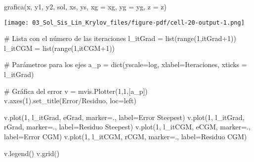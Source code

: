 \documentclass[
  letterpaper,
  DIV=11,
  numbers=noendperiod]{scrreprt}
\newenvironment{Shaded}{\begin{snugshade}}{\end{snugshade}}
\newcommand{\BuiltInTok}[1]{\textcolor[rgb]{0.00,0.23,0.31}{#1}}
\newcommand{\CommentTok}[1]{\textcolor[rgb]{0.37,0.37,0.37}{#1}}
\newcommand{\DecValTok}[1]{\textcolor[rgb]{0.68,0.00,0.00}{#1}}
\newcommand{\NormalTok}[1]{\textcolor[rgb]{0.00,0.23,0.31}{#1}}
\newcommand{\OperatorTok}[1]{\textcolor[rgb]{0.37,0.37,0.37}{#1}}
\newcommand{\StringTok}[1]{\textcolor[rgb]{0.13,0.47,0.30}{#1}}
\begin{document}
\begin{Shaded}
\begin{Highlighting}[]
\NormalTok{grafica(x, y1, y2, sol, xs, ys, xg }\OperatorTok{=}\NormalTok{ xg, yg }\OperatorTok{=}\NormalTok{ yg, z }\OperatorTok{=}\NormalTok{ z)}
\end{Highlighting}
\end{Shaded}

\texttt{[image: 03\_Sol\_Sis\_Lin\_Krylov\_files/figure-pdf/cell-20-output-1.png]}

\begin{Shaded}
\begin{Highlighting}[]
\CommentTok{\# Lista con el número de las iteraciones}
\NormalTok{l\_itGrad }\OperatorTok{=} \BuiltInTok{list}\NormalTok{(}\BuiltInTok{range}\NormalTok{(}\DecValTok{1}\NormalTok{,itGrad}\OperatorTok{+}\DecValTok{1}\NormalTok{)) }
\NormalTok{l\_itCGM }\OperatorTok{=} \BuiltInTok{list}\NormalTok{(}\BuiltInTok{range}\NormalTok{(}\DecValTok{1}\NormalTok{,itCGM}\OperatorTok{+}\DecValTok{1}\NormalTok{))}

\CommentTok{\# Parámetros para los ejes}
\NormalTok{a\_p }\OperatorTok{=} \BuiltInTok{dict}\NormalTok{(yscale}\OperatorTok{=}\StringTok{\textquotesingle{}log\textquotesingle{}}\NormalTok{, xlabel}\OperatorTok{=}\StringTok{\textquotesingle{}Iteraciones\textquotesingle{}}\NormalTok{, xticks }\OperatorTok{=}\NormalTok{ l\_itGrad)}

\CommentTok{\# Gráfica del error}
\NormalTok{v }\OperatorTok{=}\NormalTok{ mvis.Plotter(}\DecValTok{1}\NormalTok{,}\DecValTok{1}\NormalTok{,[a\_p]) }
\NormalTok{v.axes(}\DecValTok{1}\NormalTok{).set\_title(}\StringTok{\textquotesingle{}Error/Residuo\textquotesingle{}}\NormalTok{, loc}\OperatorTok{=}\StringTok{\textquotesingle{}left\textquotesingle{}}\NormalTok{)}

\NormalTok{v.plot(}\DecValTok{1}\NormalTok{, l\_itGrad, eGrad, marker}\OperatorTok{=}\StringTok{\textquotesingle{}.\textquotesingle{}}\NormalTok{, label}\OperatorTok{=}\StringTok{\textquotesingle{}Error Steepest\textquotesingle{}}\NormalTok{)}
\NormalTok{v.plot(}\DecValTok{1}\NormalTok{, l\_itGrad, rGrad, marker}\OperatorTok{=}\StringTok{\textquotesingle{}.\textquotesingle{}}\NormalTok{, label}\OperatorTok{=}\StringTok{\textquotesingle{}Residuo Steepest\textquotesingle{}}\NormalTok{)}
\NormalTok{v.plot(}\DecValTok{1}\NormalTok{, l\_itCGM, eCGM, marker}\OperatorTok{=}\StringTok{\textquotesingle{}.\textquotesingle{}}\NormalTok{, label}\OperatorTok{=}\StringTok{\textquotesingle{}Error CGM\textquotesingle{}}\NormalTok{)}
\NormalTok{v.plot(}\DecValTok{1}\NormalTok{, l\_itCGM, rCGM, marker}\OperatorTok{=}\StringTok{\textquotesingle{}.\textquotesingle{}}\NormalTok{, label}\OperatorTok{=}\StringTok{\textquotesingle{}Residuo CGM\textquotesingle{}}\NormalTok{)}

\NormalTok{v.legend()}
\NormalTok{v.grid()}
\end{Highlighting}
\end{Shaded}
\end{document}
